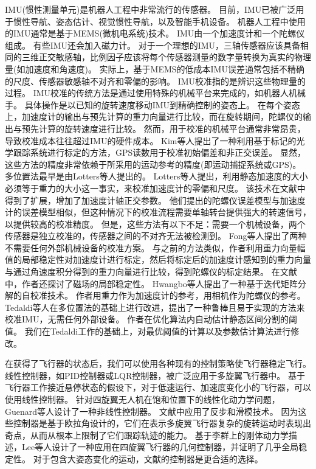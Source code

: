 \documentclass[
  type=master
]{gdutthesis}
\begin{document}
IMU(惯性测量单元)是机器人工程中非常流行的传感器。
目前，IMU已被广泛用于惯性导航\cite{jekeli2012inertial}、姿态估计\cite{mahony2008nonlinear}、视觉惯性导航\cite{baldwin2009inertial}，以及智能手机设备\cite{li2013real}。
机器人工程中使用的IMU通常是基于MEMS(微机电系统)技术。
IMU由一个加速度计和一个陀螺仪组成。
有些IMU还会加入磁力计。
对于一个理想的IMU，三轴传感器应该具备相同的三维正交敏感轴，比例因子应该将每个传感器测量的数字量转换为真实的物理量(如加速度和角速度)。
实际上，基于MEMS的低成本IMU误差通常包括不精确的尺度、传感器敏感轴不对齐和零偏的影响。
IMU校准指的是辨识这些物理量的过程。
IMU校准的传统方法是通过使用特殊的机械平台来完成的，如机器人机械手。
具体操作是以已知的旋转速度移动IMU到精确控制的姿态上\cite{hall2000case}。
在每个姿态上，加速度计的输出与预先计算的重力向量进行比较，而在旋转期间，陀螺仪的输出与预先计算的旋转速度进行比较。
然而，用于校准的机械平台通常非常昂贵，导致校准成本往往超过IMU的硬件成本。
Kim等人提出了一种利用基于标记的光学跟踪系统进行标定的方法，GPS读数用于校准初始偏差和非正交误差\cite{kim2004initial}。
显然，这些方法的精度非常依赖于所采用的运动参考的精度(即运动捕捉系统或GPS)。
多位置法最早是由Lotters等人提出的\cite{lotters1998procedure}。
Lotters等人提出，利用静态加速度的大小必须等于重力的大小这一事实，来校准加速度计的零偏和尺度。
该技术在文献\cite{syed2007new}中得到了扩展，增加了加速度计轴正交参数。
他们提出的陀螺仪误差模型与加速度计的误差模型相似，但这种情况下的校准流程需要单轴转台提供强大的转速信号，以提供较高的校准精度。
但是，这些方法有以下不足：需要一个机械设备，两个传感器是独立校准的，传感器之间的不对齐无法被检测到。
Fong等人提出了两种不需要任何外部机械设备的校准方案\cite{fong2008methods}。
与之前的方法类似，作者利用重力向量幅值的局部稳定性对加速度计进行标定，然后将标定后的加速度计感知到的重力向量与通过角速度积分得到的重力向量进行比较，得到陀螺仪的标定结果。
在文献\cite{cheuk2012automatic}中，作者还探讨了磁场的局部稳定性。
Hwangbo等人提出了一种基于迭代矩阵分解的自校准技术\cite{hwangbo2013imu}。
作者用重力作为加速度计的参考，用相机作为陀螺仪的参考。
Tedaldi等人在多位置法的基础上进行改进，提出了一种鲁棒且易于实现的方法来校准IMU，无需任何外部设备\cite{tedaldi2014robust}。
作者在优化算法内自动估计静态区间分割的阈值。
我们在Tedaldi工作的基础上，对最优阈值的计算以及参数估计算法进行修改。

在获得了飞行器的状态后，我们可以使用各种现有的控制策略使飞行器稳定飞行。
线性控制器，如PID控制器或LQR控制器，被广泛应用于多旋翼飞行器中\cite{hoffmann2007quadrotor,castillo2004stabilization,nice2004design}。
基于飞行器工作接近悬停状态的假设下，对于低速运行、加速度变化小的飞行器，可以使用线性控制器。
针对四旋翼无人机在饱和位置下的线性化动力学问题，Guenard等人设计了一种非线性控制器\cite{guenard2005dynamic}。
文献\cite{bouabdallah2005backstepping}中应用了反步和滑模技术。
因为这些控制器是基于欧拉角设计的，它们在表示多旋翼飞行器复杂的旋转运动时表现出奇点，从而从根本上限制了它们跟踪轨迹的能力。
基于李群上的刚体动力学描述，Lee等人设计了一种应用在四旋翼飞行器的几何控制器，并证明了几乎全局稳定性\cite{lee2010geometric}。
对于包含大姿态变化的运动，文献\cite{lee2010geometric}的控制器是更合适的选择。
\end{document}
